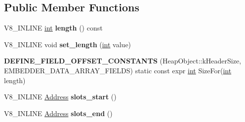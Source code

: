 \subsection*{Public Member Functions}
\begin{DoxyCompactItemize}
\item 
\mbox{\label{classv8_1_1internal_1_1EmbedderDataArray_abcc21b2f85ca92a3357d7654a111e930}} 
V8\+\_\+\+I\+N\+L\+I\+NE \mbox{\hyperlink{classint}{int}} {\bfseries length} () const
\item 
\mbox{\label{classv8_1_1internal_1_1EmbedderDataArray_a8b31a5c51f74f2c7e96ce786c3692f96}} 
V8\+\_\+\+I\+N\+L\+I\+NE void {\bfseries set\+\_\+length} (\mbox{\hyperlink{classint}{int}} value)
\item 
\mbox{\label{classv8_1_1internal_1_1EmbedderDataArray_a3dba77b10a8e7040392bd6d798e2e03f}} 
{\bfseries D\+E\+F\+I\+N\+E\+\_\+\+F\+I\+E\+L\+D\+\_\+\+O\+F\+F\+S\+E\+T\+\_\+\+C\+O\+N\+S\+T\+A\+N\+TS} (Heap\+Object\+::k\+Header\+Size, E\+M\+B\+E\+D\+D\+E\+R\+\_\+\+D\+A\+T\+A\+\_\+\+A\+R\+R\+A\+Y\+\_\+\+F\+I\+E\+L\+DS) static const expr \mbox{\hyperlink{classint}{int}} Size\+For(\mbox{\hyperlink{classint}{int}} length)
\item 
\mbox{\label{classv8_1_1internal_1_1EmbedderDataArray_acc1db71039a06b8163f191fa44a9f4b4}} 
V8\+\_\+\+I\+N\+L\+I\+NE \mbox{\hyperlink{classuintptr__t}{Address}} {\bfseries slots\+\_\+start} ()
\item 
\mbox{\label{classv8_1_1internal_1_1EmbedderDataArray_a38526bc7d52500532c40d3b76afe81ad}} 
V8\+\_\+\+I\+N\+L\+I\+NE \mbox{\hyperlink{classuintptr__t}{Address}} {\bfseries slots\+\_\+end} ()
\end{DoxyCompactItemize}
